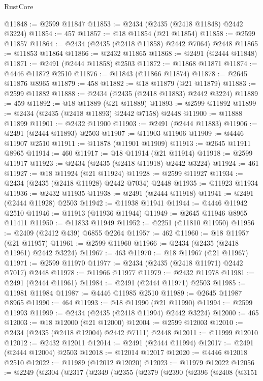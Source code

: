 \begin{lexlean}{RustCore}
\begin{coremodule}
@11848 := @2599 @11847
@11853 := @2434 (@2435 (@2418 @11848) @2442 @3224)
@11854 := 457
@11857 := @18 @11854 (@21 @11854)
@11858 := @2599 @11857
@11864 := @2434 (@2435 (@2418 @11858) @2442 @7064) @2448
@11865 := @11853 @11864
@11866 := @2432 @11865
@11868 := @2491 (@2444 @11848)
@11871 := @2491 (@2444 @11858) @2503
@11872 := @11868 @11871
@11874 := @4446 @11872 @2510
@11876 := @11843 (@11866 @11874)
@11878 := @2645 @11876 @8965
@11879 := 458
@11882 := @18 @11879 (@21 @11879)
@11883 := @2599 @11882
@11888 := @2434 (@2435 (@2418 @11883) @2442 @3224)
@11889 := 459
@11892 := @18 @11889 (@21 @11889)
@11893 := @2599 @11892
@11899 := @2434 (@2435 (@2418 @11893) @2442 @7158) @2448
@11900 := @11888 @11899
@11901 := @2432 @11900
@11903 := @2491 (@2444 @11883)
@11906 := @2491 (@2444 @11893) @2503
@11907 := @11903 @11906
@11909 := @4446 @11907 @2510
@11911 := @11878 (@11901 @11909)
@11913 := @2645 @11911 @8965
@11914 := 460
@11917 := @18 @11914 (@21 @11914)
@11918 := @2599 @11917
@11923 := @2434 (@2435 (@2418 @11918) @2442 @3224)
@11924 := 461
@11927 := @18 @11924 (@21 @11924)
@11928 := @2599 @11927
@11934 := @2434 (@2435 (@2418 @11928) @2442 @7034) @2448
@11935 := @11923 @11934
@11936 := @2432 @11935
@11938 := @2491 (@2444 @11918)
@11941 := @2491 (@2444 @11928) @2503
@11942 := @11938 @11941
@11944 := @4446 @11942 @2510
@11946 := @11913 (@11936 @11944)
@11949 := @2645 @11946 @8965 @11411
@11950 := @11833 @11949
@11952 := @2251 (@11810 @11950)
@11956 := @2409 (@2412 @439) @6855 @2264
@11957 := 462
@11960 := @18 @11957 (@21 @11957)
@11961 := @2599 @11960
@11966 := @2434 (@2435 (@2418 @11961) @2442 @3224)
@11967 := 463
@11970 := @18 @11967 (@21 @11967)
@11971 := @2599 @11970
@11977 := @2434 (@2435 (@2418 @11971) @2442 @7017) @2448
@11978 := @11966 @11977
@11979 := @2432 @11978
@11981 := @2491 (@2444 @11961)
@11984 := @2491 (@2444 @11971) @2503
@11985 := @11981 @11984
@11987 := @4446 @11985 @2510
@11989 := @2645 @11987 @8965
@11990 := 464
@11993 := @18 @11990 (@21 @11990)
@11994 := @2599 @11993
@11999 := @2434 (@2435 (@2418 @11994) @2442 @3224)
@12000 := 465
@12003 := @18 @12000 (@21 @12000)
@12004 := @2599 @12003
@12010 := @2434 (@2435 (@2418 @12004) @2442 @7111) @2448
@12011 := @11999 @12010
@12012 := @2432 @12011
@12014 := @2491 (@2444 @11994)
@12017 := @2491 (@2444 @12004) @2503
@12018 := @12014 @12017
@12020 := @4446 @12018 @2510
@12022 := @11989 (@12012 @12020)
@12023 := @11979 @12022
@12056 := @2249
    (@2304
      (@2317
        (@2349
          (@2355
            (@2379
              (@2390
                (@2396
                  (@2408
                    (@3151

\end{coremodule}
\end{lexlean}
